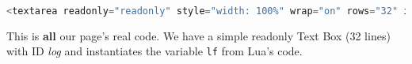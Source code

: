\begin{lstlisting}[language=javascript,caption={HTML - Log Code (IV)}]
<textarea readonly="readonly" style="width: 100%" wrap="on" rows="32" id="log"><%=lf:pcdata()%></textarea>
\end{lstlisting}

This is \textbf{all} our page's real code. We have a simple readonly Text Box (32 lines) with ID \textit{log} and instantiates the variable \texttt{lf} from Lua's code.